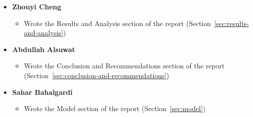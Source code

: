 \documentclass[a4paper,12pt]{article}
\begin{document}
\begin{itemize}
    \item \textbf{Zhouyi Cheng}
    \begin{itemize}
        \item Wrote the Results and Analysis section of the report (Section~\ref{sec:results-and-analysis})
    \end{itemize}

    \item \textbf{Abdullah Alsuwat}
    \begin{itemize}
        \item Wrote the Conclusion and Recommendations section of the report (Section~\ref{sec:conclusion-and-recommendations})
    \end{itemize}

    \item \textbf{Sahar Bahalgardi}
    \begin{itemize}
        \item Wrote the Model section of the report (Section~\ref{sec:model})
    \end{itemize}
\end{itemize}
\end{document}
